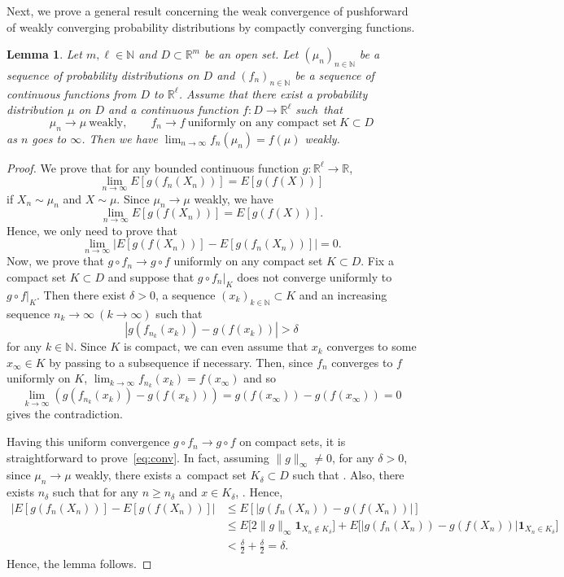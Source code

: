 \documentclass[pdftex]{sigma}
\numberwithin{equation}{section}
\newtheorem{Lemma}[Theorem]{Lemma}
\def\R{\mathbb{R}}
\def\N{{\mathbb{N}}}
\begin{document}
Next, we prove a general result concerning the weak convergence of pushforward of weakly converging probability distributions by compactly converging functions.

\begin{Lemma}\label{lem:convergence}
Let $m, \ell \in \N$ and $D \subset \R^m$ be an open set. Let $(\mu_n)_{n \in \mathbb{N}}$ be a sequence of probability distributions on $D$ and $(f_n)_{n \in \N}$ be a sequence of continuous functions from $D$ to $\R^{\ell}$. Assume that there exist a probability distribution $\mu$ on $D$ and a continuous function $f\colon D \to \R^{\ell}$ such~that
\[
\mu_n \to \mu \ \text{weakly}, \qquad f_n \to f \ \text{uniformly on any compact set} \ K \subset D
\]
as $n$ goes to $\infty$. Then we have $\lim_{n \to \infty} f_n (\mu_n) = f (\mu)$ weakly.
\end{Lemma}
\begin{proof}
We prove that for any bounded continuous function $g\colon \R^{\ell} \to \R$,
\[
\lim_{n \to \infty} E[g(f_n(X_n))]=E[g(f(X))]
\]
if $X_n \sim \mu_n$ and $X \sim \mu$. Since $\mu_n \to \mu$ weakly, we have
\[
\lim_{n \to \infty} E[g(f(X_n))]=E[g(f(X))].
\]
Hence, we only need to prove that
\begin{equation}\label{eq:conv}
\lim_{n \to \infty} | E[g(f(X_n))]- E[g(f_n(X_n))] | = 0.
\end{equation}
Now, we prove that $g\circ f_n \to g \circ f$ uniformly on any compact set $K \subset D$. Fix a compact set $K \subset D$ and suppose that $g\circ f_n |_K$ does not converge uniformly to $g \circ f |_K$. Then there exist $\delta>0$, a sequence $(x_k)_{k \in \N} \subset K$ and an increasing sequence $n_k \to \infty \ (k \to \infty)$ such that
\[
|g(f_{n_k}(x_k))-g(f(x_k))| > \delta
\]
for any $k \in \N$. Since $K$ is compact, we can even assume that $x_k$ converges to some $x_{\infty} \in K$ by passing to a subsequence if necessary. Then, since $f_n$ converges to $f$ uniformly on $K$, $ \lim_{k \to \infty} f_{n_k}(x_k) = f(x_{\infty})$ and so
\[
\lim_{k \to \infty} (g(f_{n_k}(x_k))-g(f(x_k)) )= g(f(x_{\infty}))-g(f(x_{\infty}))=0
\]
gives the contradiction.

Having this uniform convergence $g\circ f_n \to g \circ f$ on compact sets, it is straightforward to prove~\eqref{eq:conv}. In fact, assuming $\|g\|_{\infty} \neq 0$, for any $\delta>0$, since $\mu_n \to \mu$ weakly, there exists a~compact set $K_{\delta} \subset D$ such that . Also, there exists $n_{\delta}$ such that for any $n \ge n_{\delta}$ and $x \in K_{\delta}$, . Hence,
\begin{align*}
 | E[g(f_n(X_n))]- E[g(f(X_n))] | &\le E[|g(f_n(X_n))-g(f(X_n))|] \\
 & \le E\bigl[2\|g\|_{\infty}\mathbf{1}_{X_n \notin K_{\delta}}\bigr] + E\bigl[|g(f_n(X_n))-g(f(X_n))|\mathbf{1}_{X_n \in K_{\delta}}\bigr] \\
 & < \frac{\delta}{2} + \frac{\delta}{2} =\delta.
\end{align*}
Hence, the lemma follows.
\end{proof}
\end{document}
